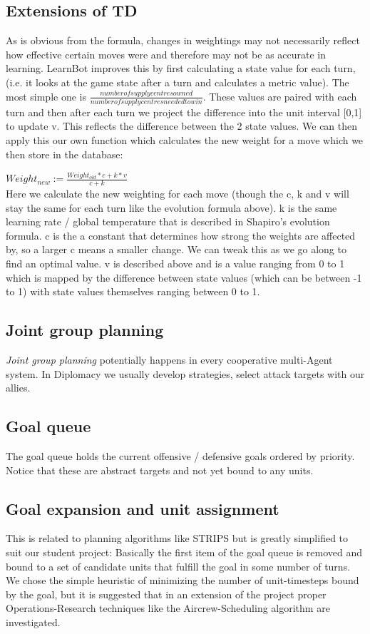 \documentclass[pdftex,11pt,a4paper]{report}
\begin{document}
\subsection{Extensions of TD}
As is obvious from the formula, changes in weightings may not
necessarily reflect how effective certain moves were and therefore may
not be as accurate in learning. LearnBot improves this by first
calculating a state value for each turn, (i.e. it looks at the game
state after a turn and calculates a metric value). The most simple one
is $\frac{number of supply centres owned}{number of supply centres
  needed to win}$. These values are paired with each turn and then
after each turn we project the difference into the unit interval [0,1]
to update v. This reflects the difference between the 2 state
values. We can then apply this our own function which calculates the
new weight for a move which we then store in the database:

$Weight_{new} := \frac{Weight_{old}*c+k*v}{c+k}$ \\

Here we calculate the new weighting for each move (though the c, k and
v will stay the same for each turn like the evolution formula above).
k is the same learning rate / global temperature that is described in
Shapiro's evolution formula.  c is the a constant that determines how
strong the weights are affected by, so a larger c means a smaller
change. We can tweak this as we go along to find an optimal value.  v
is described above and is a value ranging from 0 to 1 which is mapped
by the difference between state values (which can be between -1 to 1)
with state values themselves ranging between 0 to 1.

\subsection{Joint group planning}
\textit{Joint group planning} potentially happens in every
cooperative multi-Agent system. In Diplomacy we usually develop
strategies, select attack targets with our allies.  

\subsection{Goal queue}
The goal queue holds the current offensive / defensive
goals ordered by priority. Notice that these are abstract
targets and not yet bound to any units.

\subsection{Goal expansion and unit assignment}
This is related to planning algorithms like STRIPS but is
greatly simplified to suit our student project: Basically
the first item of the goal queue is removed and bound to
a set of candidate units that fulfill the goal in some 
number of turns. We chose the simple heuristic of minimizing
the number of unit-timesteps bound by the goal, but it 
is suggested that in an extension of the project proper
Operations-Research techniques like the Aircrew-Scheduling
algorithm are investigated.
\end{document}
